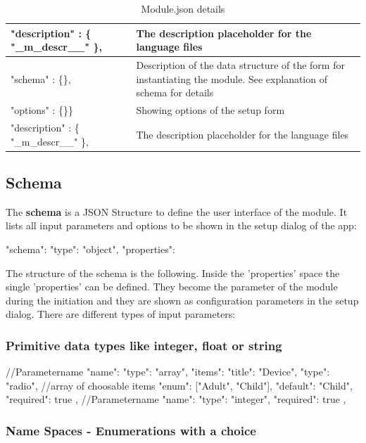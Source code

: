 \begin{table}
\begin{tabular}{|p{}|p{}|}
\hline
"description" : \{ "\_m\_descr\_\_" \}, &
The description placeholder for the language files \\
\hline
"schema" : \{\}, & Description of the data structure of the form for
instantiating the module. See explanation of schema for details \\
\hline
"options" : \{\}\} & Showing options of the setup form\\
\hline
"description" : \{ "\_m\_descr\_\_" \}, &
The description placeholder for the language files \\
\hline
\end{tabular}
\caption{Module.json details} 
\label{tab:module.json}
\end{table}	

\subsection{Schema}

The \textbf{schema} is a JSON Structure to define the user interface of the module.
It lists all input parameters and  options to be shown in the setup dialog of the app:

\begin{listingverbatim}
{
  "schema": {
    "type": "object",
    "properties": {
    }
  }
}
\end{listingverbatim}


The structure of the schema is the following. Inside the 'properties' space the single 'properties' 
can be defined. They become the parameter of the module during the initiation and they 
are shown as configuration parameters in the setup dialog. There are different
types of input parameters:


\subsubsection{Primitive data types like integer, float or string}

\begin{listingverbatim}
{
  //Parametername
  "name": {
    "type": "array",
    "items": {
      "title": "Device",
      "type": "radio",
      //array of choosable items
      "enum": ["Adult", "Child"],
      "default": "Child",
      "required": true
    }
  },
  //Parametername
  "name": {
    "type": "integer",
    "required": true
  },
}
\end{listingverbatim}

\subsubsection{Name Spaces  - Enumerations with a choice}

